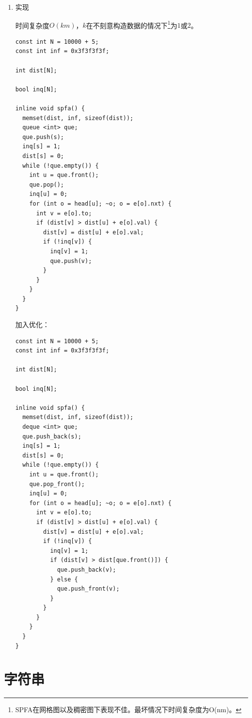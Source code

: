 \documentclass[11pt]{article}
\begin{document}
\begin{enumerate}
\begin{enumerate}
\item SLF
\label{sec-2-6-2-2-2}

\(Small\ Label\ First\) 策略：设要加入的节点为\(j\)，队首节点为\(i\)，如果满足\(dist_j < dist_i\)，则将其插入到队首，否则插入到队尾。
\end{enumerate}

\item 实现
\label{sec-2-6-2-3}

时间复杂度\(O(km)\)，\(k\)在不刻意构造数据的情况下\footnote{SPFA在网格图以及稠密图下表现不佳。最坏情况下时间复杂度为O(nm)。}为\(1\)或\(2\)。

\begin{verbatim}
const int N = 10000 + 5;
const int inf = 0x3f3f3f3f;

int dist[N];

bool inq[N];

inline void spfa() {
  memset(dist, inf, sizeof(dist));
  queue <int> que;
  que.push(s);
  inq[s] = 1;
  dist[s] = 0;
  while (!que.empty()) {
    int u = que.front();
    que.pop();
    inq[u] = 0;
    for (int o = head[u]; ~o; o = e[o].nxt) {
      int v = e[o].to;
      if (dist[v] > dist[u] + e[o].val) {
        dist[v] = dist[u] + e[o].val;
        if (!inq[v]) {
          inq[v] = 1;
          que.push(v);
        }
      }
    }
  }
}
\end{verbatim}

加入优化：

\begin{verbatim}
const int N = 10000 + 5;
const int inf = 0x3f3f3f3f;

int dist[N];

bool inq[N];

inline void spfa() {
  memset(dist, inf, sizeof(dist));
  deque <int> que;
  que.push_back(s);
  inq[s] = 1;
  dist[s] = 0;
  while (!que.empty()) {
    int u = que.front();
    que.pop_front();
    inq[u] = 0;
    for (int o = head[u]; ~o; o = e[o].nxt) {
      int v = e[o].to;
      if (dist[v] > dist[u] + e[o].val) {
        dist[v] = dist[u] + e[o].val;
        if (!inq[v]) {
          inq[v] = 1;
          if (dist[v] > dist[que.front()]) {
            que.push_back(v);
          } else {
            que.push_front(v);
          }
        }
      }
    }
  }
}
\end{verbatim}
\end{enumerate}

\section{字符串}
\label{sec-3}
\end{document}

